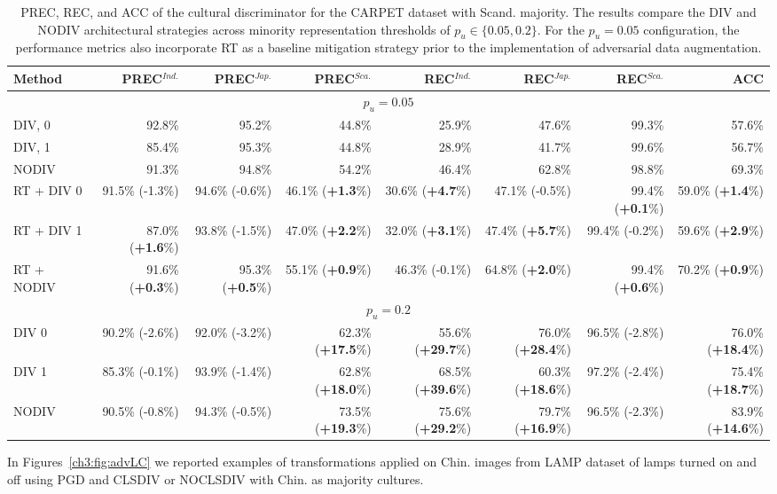 %
\begin{table}
\centering
\scriptsize
\setlength{\tabcolsep}{0.1cm}
\begin{tabular}{lrrrrrrr}
\toprule
\textbf{Method} & \textbf{PREC}$^{Ind.}$  & \textbf{PREC}$^{Jap.}$ & \textbf{PREC}$^{Sca.}$ & \textbf{REC}$^{Ind.}$ & \textbf{REC}$^{Jap.}$ & \textbf{REC}$^{Sca.}$ &  \textbf{ACC}\\
\midrule
\multicolumn{8}{c}{$p_u=0.05$} \\
\midrule
DIV, 0 & 92.8\%&	95.2\%&	44.8\%&	25.9\%&	47.6\%&	99.3\%&	57.6\%	\\
DIV, 1 & 85.4\%&	95.3\%&	44.8\%&	28.9\%&	41.7\%&	99.6\%&	56.7\%\\
NODIV & 91.3\%	&	94.8\%&	54.2\%&	46.4\%&	62.8\%&	98.8\%&	69.3\%\\
\midrule
RT + DIV 0      & 91.5\% (-1.3\%) & 94.6\% (-0.6\%) & 46.1\% (\textbf{+1.3}\%) & 30.6\% (\textbf{+4.7}\%) & 47.1\% (-0.5\%) & 99.4\% (\textbf{+0.1}\%) & 59.0\% (\textbf{+1.4}\%) \\
RT + DIV 1      & 87.0\% (\textbf{+1.6}\%) & 93.8\% (-1.5\%) & 47.0\% (\textbf{+2.2}\%) & 32.0\% (\textbf{+3.1}\%) & 47.4\% (\textbf{+5.7}\%) & 99.4\% (-0.2\%) & 59.6\% (\textbf{+2.9}\%) \\
RT + NODIV      & 91.6\% (\textbf{+0.3}\%) & 95.3\% (\textbf{+0.5}\%) & 55.1\% (\textbf{+0.9}\%) & 46.3\% (-0.1\%) & 64.8\% (\textbf{+2.0}\%) & 99.4\% (\textbf{+0.6}\%) & 70.2\% (\textbf{+0.9}\%) \\
\midrule
\multicolumn{8}{c}{$p_u=0.2$} \\
\midrule
DIV 0           & 90.2\% (-2.6\%) & 92.0\% (-3.2\%) & 62.3\% (\textbf{+17.5}\%) & 55.6\% (\textbf{+29.7}\%) & 76.0\% (\textbf{+28.4}\%) & 96.5\% (-2.8\%) & 76.0\% (\textbf{+18.4}\%) \\
DIV 1           & 85.3\% (-0.1\%) & 93.9\% (-1.4\%) & 62.8\% (\textbf{+18.0}\%) & 68.5\% (\textbf{+39.6}\%) & 60.3\% (\textbf{+18.6}\%) & 97.2\% (-2.4\%) & 75.4\% (\textbf{+18.7}\%) \\
NODIV           & 90.5\% (-0.8\%) & 94.3\% (-0.5\%) & 73.5\% (\textbf{+19.3}\%) & 75.6\% (\textbf{+29.2}\%) & 79.7\% (\textbf{+16.9}\%) & 96.5\% (-2.3\%) & 83.9\% (\textbf{+14.6}\%) \\
\midrule
\end{tabular}
\caption{PREC, REC, and ACC of the cultural discriminator for the CARPET dataset with Scand. majority. The results compare the DIV and NODIV architectural strategies across minority representation thresholds of $p_u \in \{0.05, 0.2\}$. For the $p_u = 0.05$ configuration, the performance metrics also incorporate RT as a baseline mitigation strategy prior to the implementation of adversarial data augmentation.}
\label{ch3:tab:discr:CS}
\end{table}
%
In Figures~\ref{ch3:fig:advLC} we reported examples of transformations applied on Chin. images from LAMP dataset of lamps turned on and off using PGD and CLSDIV or NOCLSDIV with Chin. as majority cultures.


